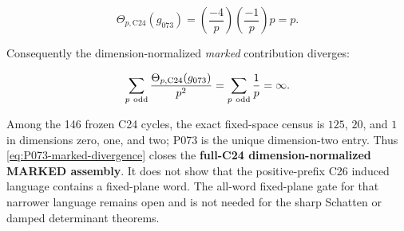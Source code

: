 \begin{equation}
 \Theta_{p,\mathrm{C24}}(g_{073})
 =\left(\frac{-4}{p}\right)
  \left(\frac{-1}{p}\right)p=p.
 \label{eq:P073-character}
\end{equation}

Consequently the dimension-normalized \emph{marked} contribution diverges:

\begin{equation}
 \sum_{p\ \odd}\frac{\Theta_{p,\mathrm{C24}}(g_{073})}{p^2}
 =\sum_{p\ \odd}\frac1p=\infty.
 \label{eq:P073-marked-divergence}
\end{equation}

Among the 146 frozen C24 cycles, the exact fixed-space census is \(125\),
\(20\), and \(1\) in dimensions zero, one, and two; P073 is the unique
dimension-two entry.  Thus
\cref{eq:P073-marked-divergence} closes the
\textbf{full-C24 dimension-normalized MARKED assembly}.  It does not show
that the positive-prefix C26 induced language contains a fixed-plane word.
The all-word fixed-plane gate for that narrower language remains open and is
not needed for the sharp Schatten or damped determinant theorems.
